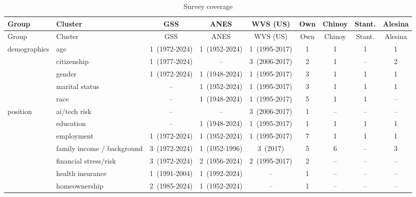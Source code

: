 \documentclass[11pt, headsepline]{article}
\begin{document}
\begin{landscape}

\begingroup\footnotesize\setlength{\tabcolsep}{4pt}\renewcommand{\arraystretch}{0.92}
\begin{longtable}{@{}l p{2.6in} ccc cccc@{}}
\caption{Survey coverage}\label{tab:clusters_wide}\\
\toprule
Group & Cluster & GSS & ANES & WVS (US) & Own & Chinoy & Stant. & Alesina \\
\midrule\endfirsthead
\toprule
Group & Cluster & GSS & ANES & WVS (US) & Own & Chinoy & Stant. & Alesina \\
\midrule\endhead
demographics & age & 1~(1972-2024) & 1~(1952-2024) & 1~(1995-2017) & 1 & 1 & 1 & 1 \\
 & citizenship & 1~(1977-2024) & \textcolor[gray]{0.62}{--} & 3~(2006-2017) & 2 & 1 & \textcolor[gray]{0.62}{--} & 2 \\
 & gender & 1~(1972-2024) & 1~(1948-2024) & 1~(1995-2017) & 3 & 1 & 1 & 1 \\
 & marital status & \textcolor[gray]{0.62}{--} & 1~(1952-2024) & 1~(1995-2017) & 3 & 1 & 1 & 1 \\
 & race & \textcolor[gray]{0.62}{--} & 1~(1948-2024) & 1~(1995-2017) & 5 & 1 & 1 & \textcolor[gray]{0.62}{--} \\
\addlinespace[2pt]
position & ai/tech risk & \textcolor[gray]{0.62}{--} & \textcolor[gray]{0.62}{--} & 3~(2006-2017) & 1 & \textcolor[gray]{0.62}{--} & \textcolor[gray]{0.62}{--} & \textcolor[gray]{0.62}{--} \\
 & education & \textcolor[gray]{0.62}{--} & 1~(1948-2024) & 1~(1995-2017) & 1 & 1 & 1 & 1 \\
 & employment & 1~(1972-2024) & 1~(1952-2024) & 1~(1995-2017) & 7 & 1 & 1 & 1 \\
 & family income / background & 3~(1972-2024) & 1~(1952-1996) & 3~(2017) & 5 & 6 & \textcolor[gray]{0.62}{--} & 3 \\
 & financial stress/risk & 3~(1972-2024) & 2~(1956-2024) & 2~(1995-2017) & 2 & \textcolor[gray]{0.62}{--} & \textcolor[gray]{0.62}{--} & \textcolor[gray]{0.62}{--} \\
 & health insurance & 1~(1991-2004) & 1~(1992-2024) & \textcolor[gray]{0.62}{--} & 1 & \textcolor[gray]{0.62}{--} & \textcolor[gray]{0.62}{--} & \textcolor[gray]{0.62}{--} \\
 & homeownership & 2~(1985-2024) & 1~(1952-2024) & \textcolor[gray]{0.62}{--} & 1 & \textcolor[gray]{0.62}{--} & \textcolor[gray]{0.62}{--} & \textcolor[gray]{0.62}{--} \\

\end{longtable}
\end{landscape}
\end{document}
